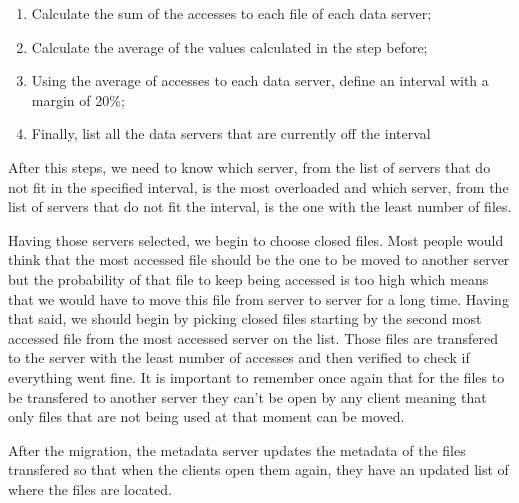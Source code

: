 \begin{enumerate}

\item Calculate the sum of the accesses to each file of each data server;
\item Calculate the average of the values calculated in the step before;
\item Using the average of accesses to each data server, define an interval with
a margin of 20\%;
\item Finally, list all the data servers that are currently off the interval

\end{enumerate}

After this steps, we need to know which server, from the list of servers that do not
fit in the specified interval, is the most overloaded and which server, from the list
of servers that do not fit the interval, is the one with the least number of files.

Having those servers selected, we begin to choose closed files. Most people would
think that the most accessed file should be the one to be moved to another server
but the probability of that file to keep being accessed is too high which means that
we would have to move this file from server to server for a long time. Having that said,
we should begin by picking closed files starting by the second most accessed file from
the most accessed server on the list. Those files are transfered to the server with
the least number of accesses and then verified to check if everything went fine. It is
important to remember once again that for the files to be transfered to another
server they can't be open by any client meaning that only files that are not being used
at that moment can be moved.

After the migration, the metadata server updates the metadata of the files transfered
so that when the clients open them again, they have an updated list of where the files
are located.


